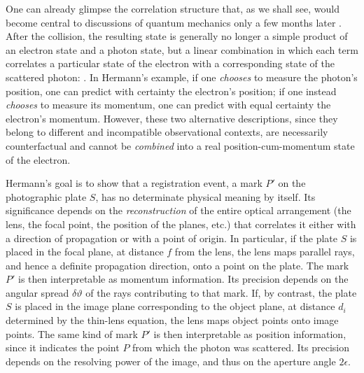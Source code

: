 \documentclass[pdflatex]{sn-jnl}
\newcommand{\NGQ}[2]{\citep[#1/#2]{Hermann1935}}
\begin{document}
One can already glimpse the correlation structure that, as we shall see, would become central to discussions of quantum mechanics only a few months later \citep[sec.~5.2]{Filk2016}. After the collision, the resulting state is generally no longer a simple product of an electron state and a photon state, but a linear combination in which each term correlates a particular state of the electron with a corresponding state of the scattered photon:  \NGQ{137}{270}. In Hermann’s example, if one \emph{chooses} to measure the photon’s position, one can predict with certainty the electron’s position; if one instead \emph{chooses} to measure its momentum, one can predict with equal certainty the electron’s momentum. However, these two alternative descriptions, since they belong to different and incompatible observational contexts, are necessarily counterfactual and cannot be \emph{combined} into a real position-cum-momentum state of the electron.

Hermann's goal is to show that a registration event, a mark $P'$ on the photographic plate $S$, has no determinate physical meaning by itself. Its significance depends on the \emph{reconstruction} of the entire optical arrangement (the lens, the focal point, the position of the planes, etc.) that correlates it either with a direction of propagation or with a point of origin. In particular, if the plate $S$ is placed in the focal plane, at distance $f$ from the lens, the lens maps parallel rays, and hence a definite propagation direction, onto a point on the plate. The mark $P'$ is then interpretable as momentum information. Its precision depends on the angular spread $\delta\vartheta$ of the rays contributing to that mark. If, by contrast, the plate $S$ is placed in the image plane corresponding to the object plane, at distance $d_i$ determined by the thin-lens equation, the lens maps object points onto image points. The same kind of mark $P'$ is then interpretable as position information, since it indicates the point $P$ from which the photon was scattered. Its precision depends on the resolving power of the image, and thus on the aperture angle $2\epsilon$.
\end{document}
